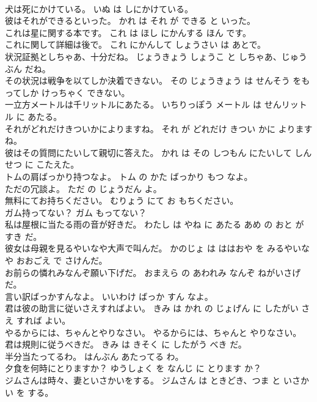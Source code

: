\documentclass[8pt]{extreport}
\begin{document}
\begin{CJK}{UTF8}{min}
\\	犬は死にかけている。	いぬ は しにかけている。	
\\	彼はそれができるといった。	かれ は それ が できる と いった。	
\\	これは星に関する本です。	これ は ほし にかんする ほん です。	
\\	これに関して詳細は後で。	これ にかんして しょうさい は あとで。	
\\	状況証拠としちゃあ、十分だね。	じょうきょう しょうこ と しちゃあ、じゅうぶん だね。	
\\	その状況は戦争を以てしか決着できない。	その じょうきょう は せんそう をもってしか けっちゃく できない。	
\\	一立方メートルは千リットルにあたる。	いちりっぽう メートル は せんリットル に あたる。	
\\	それがどれだけきついかによりますね。	それ が どれだけ きつい かに よります ね。	
\\	彼はその質問にたいして親切に答えた。	かれ は その しつもん にたいして しんせつ に こたえた。	
\\	トムの肩ばっかり持つなよ。	トム の かた ばっかり もつ なよ。	
\\	ただの冗談よ。	ただ の じょうだん よ。	
\\	無料にてお持ちください。	むりょう にて お もちください。	
\\	ガム持ってない？	ガム もってない？	
\\	私は屋根に当たる雨の音が好きだ。	わたし は やね に あたる あめ の おと が すき だ。	
\\	彼女は母親を見るやいなや大声で叫んだ。	かのじょ は ははおや を みるやいなや おおごえ で さけんだ。	
\\	お前らの憐れみなんぞ願い下げだ。	おまえら の あわれみ なんぞ ねがいさげ だ。	
\\	言い訳ばっかすんなよ。	いいわけ ばっか すん なよ。	
\\	君は彼の助言に従いさえすればよい。	きみ は かれ の じょげん に したがい さえ すれば よい。	
\\	やるからには、ちゃんとやりなさい。	やるからには、ちゃんと やりなさい。	
\\	君は規則に従うべきだ。	きみ は きそく に したがう べき だ。	
\\	半分当たってるわ。	はんぶん あたってる わ。	
\\	夕食を何時にとりますか？	ゆうしょく を なんじ に とります か？	
\\	ジムさんは時々、妻といさかいをする。	ジムさん は ときどき、つま と いさかい を する。	

\end{CJK}
\end{document}
